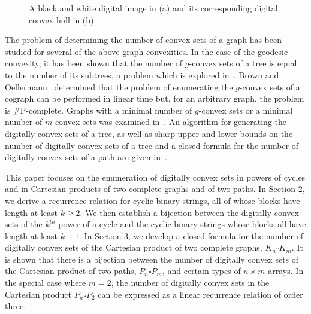 \documentclass[12pt]{article}
\begin{document}
\begin{figure}[ht]
\centering
{}
\hspace{15mm}
\caption{A black and white digital image in (a) and its corresponding digital convex hull in (b)}
\label{fig:image}
\end{figure}

The problem of determining the number of convex sets of a graph has been studied for several of the above graph convexities. In the case of the geodesic convexity, it has been shown that the number of $g$-convex sets of a tree is equal to the number of its subtrees, a problem which is explored in~\cite{subtrees,binary,enumsub}. Brown and Oellermann~\cite{spectrum} determined that the problem of enumerating the $g$-convex sets of a cograph can be performed in linear time but, for an arbitrary graph, the problem is \#P-complete. Graphs with a minimal number of $g$-convex sets or a minimal number of $m$-convex sets was examined in~\cite{minimalconv}. An algorithm for generating the digitally convex sets of a tree, as well as sharp upper and lower bounds on the number of digitally convex sets of a tree and a closed formula for the number of digitally convex sets of a path are given in~\cite{enumtree}.   

This paper focuses on the enumeration of digitally convex sets in powers of cycles and in Cartesian products of two complete graphs and of two paths. In Section 2, we derive a recurrence relation for cyclic binary strings, all of whose blocks have length at least $k \geq 2$. We then establish a bijection between the digitally convex sets of the $k^{th}$ power of a cycle and the cyclic binary strings whose blocks all have length at least $k+1$. In Section 3, we develop a closed formula for the number of digitally convex sets of the Cartesian product of two complete graphs, $K_n\square K_m$. It is shown that there is a bijection between the number of digitally convex sets of the Cartesian product of two paths, $P_n\square P_m$, and certain types of $n\times m$ arrays. In the special case where $m=2$, the number of digitally convex sets in the Cartesian product $P_n\square P_2$ can be expressed as a linear recurrence relation of order three. 
\end{document}
